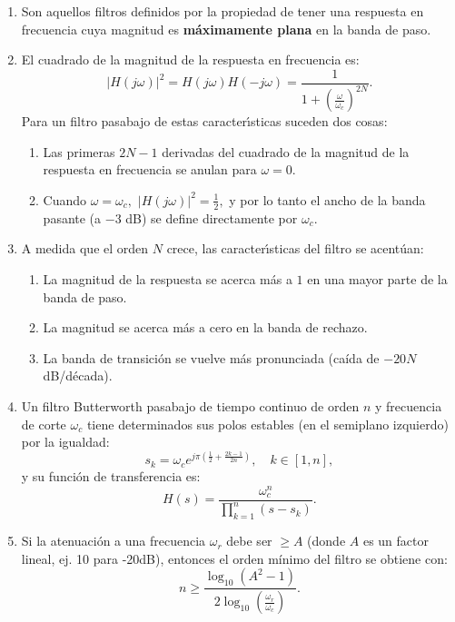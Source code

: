 \begin{enumerate}
	\item Son aquellos filtros definidos por la propiedad de tener una respuesta en frecuencia cuya magnitud es \textbf{m\'{a}ximamente plana} en la banda de paso.
	\item El cuadrado de la magnitud de la respuesta en frecuencia es:
	\begin{equation}
		|H(j\omega)|^{2} = H(j\omega) H(-j\omega) = \frac{1}{1 + \left( \frac{\omega}{\omega_c} \right)^{2N}}.
	\end{equation}
	Para un filtro pasabajo de estas caracter\'{\i}sticas suceden dos cosas:
	\begin{enumerate}
		\item Las primeras $2N-1$ derivadas del cuadrado de la magnitud de la respuesta en frecuencia se anulan para $\omega = 0$.
		\item Cuando $\omega = \omega_c,$ $|H(j\omega)|^{2} = \frac{1}{2},$ y por lo tanto el ancho de la banda pasante (a $-3$ dB) se define directamente por $\omega_c.$
	\end{enumerate}
	
	\item A medida que el orden $N$ crece, las caracter\'{\i}sticas del filtro se acent\'{u}an: 
	\begin{enumerate}
		\item La magnitud de la respuesta se acerca m\'{a}s a $1$ en una mayor parte de la banda de paso.
		\item La magnitud se acerca m\'{a}s a cero en la banda de rechazo.
		\item La banda de transici\'{o}n se vuelve más pronunciada (caída de $-20N$ dB/década).
	\end{enumerate}
	
	\item Un filtro Butterworth pasabajo de tiempo continuo de orden $n$ y frecuencia de corte $\omega_c$ tiene determinados sus polos estables (en el semiplano izquierdo) por la igualdad:
	\begin{equation}
		s_{k} = \omega_c e^{j \pi \left(\frac{1}{2} + \frac{2k-1}{2n}\right)}, \quad  k \in [1,n],
	\end{equation}
	y su funci\'{o}n de transferencia es:
	\begin{equation}
		H(s) = \frac{\omega_c^n}{\prod_{k=1}^{n} (s - s_{k})}.
	\end{equation}
	
	\item Si la atenuaci\'{o}n a una frecuencia $\omega_{r}$ debe ser $\ge A$ (donde $A$ es un factor lineal, ej. 10 para -20dB), entonces el orden mínimo del filtro se obtiene con:
	\begin{equation}
		n \ge \frac{\log_{10}(A^{2}-1)}{2 \log_{10}\left(\frac{\omega_{r}}{\omega_{c}}\right)}.
	\end{equation}
\end{enumerate}

